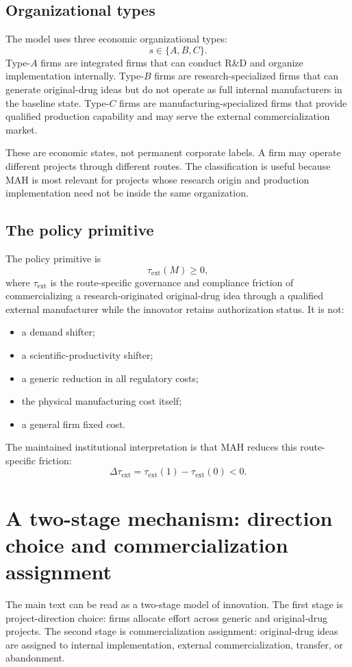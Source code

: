 \documentclass[12pt]{article}
\newcommand{\tauext}{\tau_{\mathrm{ext}}}
\begin{document}
\subsection{Organizational types}

The model uses three economic organizational types:
\[
s\in\{A,B,C\}.
\]
Type-$A$ firms are integrated firms that can conduct R\&D and organize implementation internally. Type-$B$ firms are research-specialized firms that can generate original-drug ideas but do not operate as full internal manufacturers in the baseline state. Type-$C$ firms are manufacturing-specialized firms that provide qualified production capability and may serve the external commercialization market.

These are economic states, not permanent corporate labels. A firm may operate different projects through different routes. The classification is useful because MAH is most relevant for projects whose research origin and production implementation need not be inside the same organization.

\subsection{The policy primitive}

The policy primitive is
\[
\tauext(M)\geq 0,
\]
where $\tauext$ is the route-specific governance and compliance friction of commercializing a research-originated original-drug idea through a qualified external manufacturer while the innovator retains authorization status. It is not:
\begin{itemize}
    \item a demand shifter;
    \item a scientific-productivity shifter;
    \item a generic reduction in all regulatory costs;
    \item the physical manufacturing cost itself;
    \item a general firm fixed cost.
\end{itemize}
The maintained institutional interpretation is that MAH reduces this route-specific friction:
\[
\Delta \tauext = \tauext(1)-\tauext(0)<0.
\]

\section{A two-stage mechanism: direction choice and commercialization assignment}

The main text can be read as a two-stage model of innovation. The first stage is project-direction choice: firms allocate effort across generic and original-drug projects. The second stage is commercialization assignment: original-drug ideas are assigned to internal implementation, external commercialization, transfer, or abandonment.
\end{document}
